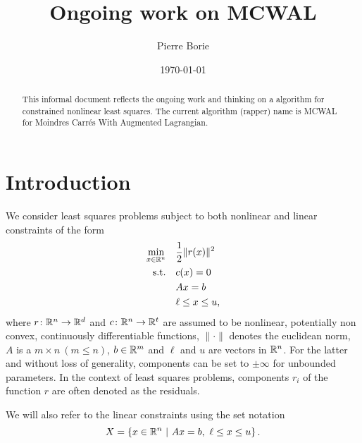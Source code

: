 \documentclass[10pt]{article}
\title{Ongoing work on MCWAL} %
\author{Pierre Borie}
\date{\today}
\begin{document}
	
	\maketitle
	
	\let\thefootnote\relax
	
	\begin{abstract}
		\noindent This informal document  reflects the ongoing work and thinking on a algorithm for constrained nonlinear least squares. The current algorithm (rapper) name is MCWAL for Moindres Carr\'es With Augmented Lagrangian.
	\end{abstract} %
	
	

	\section{Introduction}\label{sec:intro}
	
	We consider least squares problems subject to both nonlinear and linear constraints of the form
	\begin{equation}
		\label{eq:model_cnls}
		\begin{aligned}
			\min_{x\in {\mathbb{R}}^n} \quad & \dfrac{1}{2} \|r(x)\|^2 \\
			\text{s.t.} \quad & c(x) = 0 \\
			& Ax = b \\
			& \ell \le x \le u,
		\end{aligned}
	\end{equation}
	where $r\colon {\mathbb{R}}^n \to {\mathbb{R}}^d$  and $c\colon {\mathbb{R}}^n \to {\mathbb{R}}^t$ are assumed to be nonlinear, potentially non convex, continuously differentiable functions, $\|\cdot\| $ denotes the euclidean norm, $A$ is a $m\times n \ ( m \le n)$, $b \in {\mathbb{R}}^m$ and $\ell$ and $u$ are vectors in ${\mathbb{R}}^n$. For the latter and without loss of generality, components can be set to $\pm \infty$ for unbounded parameters. In the context of least squares problems, components $r_i$ of the function $r$ are often denoted as the residuals.
	
	We will also refer to the linear constraints using the set notation
	\begin{equation}
		\label{eq:linear_constraints}
		X = \left\{ x \in {\mathbb{R}}^n \ | \ Ax=b,\ \ell \le x \le u\right\}.
	\end{equation}
	
	
	
	
	
\end{document}
